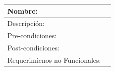 \documentclass[letterpaper,12pt]{article} %
\numberwithin{equation}{section} %
\numberwithin{figure}{section} %
\numberwithin{table}{section} %
\begin{document}
\begin{table}[hb!]
  \begin{tabular}{p{3cm}p{7cm}}\hline\hline
    Nombre: &  \\ \hline
    Descripci\'on: & \\ \hline %
    Pre-condiciones: & \\ \hline
    Post-condiciones: & \\ \hline
    Requerimienos no Funcionales: & \\ \hline\hline %
  \end{tabular}
\end{table}



%
%
%
%
%
\end{document}

